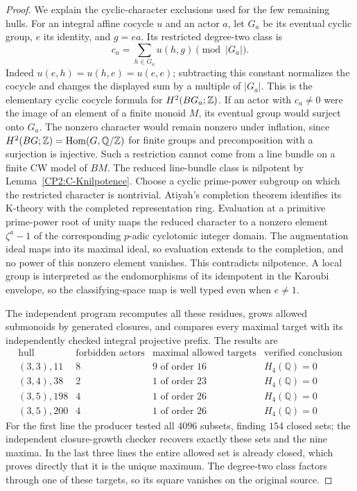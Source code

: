 \begin{proof}
We explain the cyclic-character exclusions used for the few
remaining hulls. For an integral affine cocycle $u$ and an actor
$a$, let $G_a$ be its eventual cyclic group, $e$ its identity,
and $g=ea$. Its restricted degree-two class is
\[
 c_a=\sum_{h\in G_a}u(h,g)\pmod{|G_a|}.
\]
Indeed $u(e,h)=u(h,e)=u(e,e)$; subtracting this constant
normalizes the cocycle and changes the displayed sum by a
multiple of $|G_a|$. This is the elementary cyclic cocycle
formula for $H^2(BG_a;\mathbb{Z})$.
If an actor with $c_a\ne0$ were the image of an element of a
finite monoid $M$, its eventual group would surject onto $G_a$.
The nonzero character would remain nonzero under inflation,
since $H^2(BG;\mathbb{Z})=\operatorname{Hom}(G,\mathbb Q/\mathbb{Z})$ for
finite groups and precomposition with a surjection is injective.
Such a restriction cannot come from a line bundle on a finite
CW model of $BM$. The reduced line-bundle class is nilpotent
by Lemma~\ref{CP2:C-Knilpotence}. Choose a cyclic prime-power
subgroup on which the restricted character is nontrivial.
Atiyah's completion theorem \cite[Theorem~7.2]{CP2-Atiyah1961}
identifies its K-theory with the completed representation ring.
Evaluation at a primitive prime-power root of unity maps the
reduced character to a nonzero element $\zeta^a-1$ of the
corresponding $p$-adic cyclotomic integer domain. The
augmentation ideal maps into its maximal ideal, so evaluation
extends to the completion, and no power of this nonzero
element vanishes. This contradicts nilpotence. A local group is interpreted as
the endomorphisms of its idempotent in the Karoubi envelope,
so the classifying-space map is well typed even when $e\ne1$.

The independent program
 recomputes all
these residues, grows allowed submonoids by generated closures,
and compares every maximal target with its independently
checked integral projective prefix. The results are
\[
\begin{array}{c|r|r|l}
 \text{hull}&\text{forbidden actors}&\text{maximal allowed targets}
 &\text{verified conclusion}\\\hline
 (3,3),11&8&9\text{ of order }16&H_4(\mathbb Q)=0\\
 (3,4),38&2&1\text{ of order }23&H_4(\mathbb Q)=0\\
 (3,5),198&4&1\text{ of order }26&H_4(\mathbb Q)=0\\
 (3,5),200&4&1\text{ of order }26&H_4(\mathbb Q)=0
\end{array}
\]
For the first line the producer tested all $4096$ subsets,
finding $154$ closed sets; the independent closure-growth
checker recovers exactly these sets and the nine maxima.
In the last three lines the entire allowed set is already
closed, which proves directly that it is the unique maximum.
The degree-two class factors through one of these targets,
so its square vanishes on the original source.


\end{proof}
